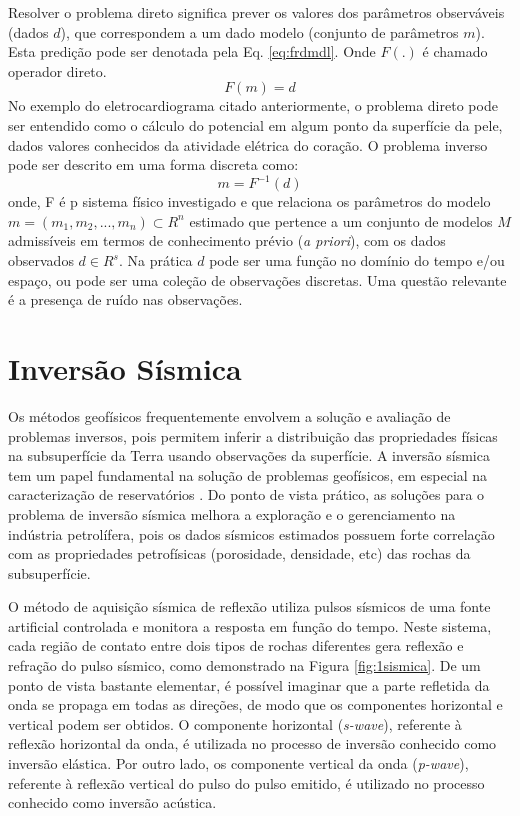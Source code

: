 Resolver o problema direto significa prever os valores dos parâmetros observáveis (dados $d$),
que correspondem a um dado modelo (conjunto de parâmetros $m$). Esta predição pode ser denotada
pela Eq. \ref{eq:frdmdl}. Onde $F(.)$ é chamado operador direto.
\begin{equation}
\label{eq:frdmdl}
F(m) = d 
\end{equation}
No exemplo do eletrocardiograma citado anteriormente, o problema direto pode
ser entendido como o cálculo do potencial em algum ponto da superfície da pele,
dados valores conhecidos da atividade elétrica do coração.
O problema inverso pode ser descrito em uma forma discreta como:
\begin{equation}
\label{eq:deqgm}
m = F^{-1}(d)
\end{equation}
onde, F é p sistema físico investigado e que relaciona os parâmetros do modelo $m=(m_1, m_2,...,m_n) \subset R^n$
estimado que pertence a um conjunto de modelos $M$ admissíveis
em termos de conhecimento prévio (\textit{a priori}), com os dados observados $d \in R^s$.
Na prática $d$ pode ser uma função no domínio do tempo e/ou espaço, ou pode ser
uma coleção de observações discretas. Uma questão relevante é a presença de
ruído nas observações.

\section{Inversão Sísmica}

Os métodos geofísicos frequentemente envolvem a solução e avaliação de problemas inversos,
pois permitem inferir a distribuição das propriedades físicas na subsuperfície da Terra
usando observações da superfície. A inversão sísmica tem um papel fundamental na solução 
de problemas geofísicos, em especial na caracterização de reservatórios \cite{Bosch2010} \cite{Srivastava2009}.
Do ponto de vista prático, as soluções para o problema de inversão sísmica melhora a exploração e
o gerenciamento na indústria petrolífera, pois os dados sísmicos estimados possuem forte correlação com as
propriedades petrofísicas (porosidade, densidade, etc) das rochas da subsuperfície\cite{Figueiredo2014}.

O método de aquisição sísmica de reflexão utiliza
pulsos sísmicos de uma fonte artificial controlada e monitora a resposta em
função do tempo. Neste sistema, cada região de contato entre dois tipos de rochas
diferentes gera reflexão e refração do pulso sísmico, como demonstrado na Figura
\ref{fig:1sismica}.
De um ponto de vista bastante elementar, é possível imaginar que a parte refletida da onda se
propaga em todas as direções, de modo que os componentes horizontal e vertical podem ser obtidos.
O componente horizontal (\textit{s-wave}), referente à reflexão horizontal
da onda, é utilizada no processo de inversão conhecido como inversão elástica. Por outro lado, os componente
vertical da onda (\textit{p-wave}), referente à reflexão vertical do pulso do pulso emitido, é utilizado no processo
conhecido como inversão acústica.

